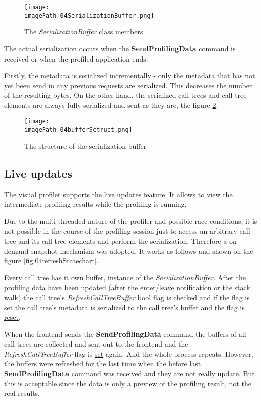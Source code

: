\begin{figure}
	\centering
		\texttt{[image: \\imagePath 04SerializationBuffer.png]}
		\caption{The \textit{SerializationBuffer} class members}
	\label{fig:04SerializationBuffer}
\end{figure}

The actual serialization occurs when the \textbf{SendProfilingData} command is received or when the profiled application ends. 

Firstly, the metadata is serialized incrementally - only the metadata that has not yet been send in any previous requests are serialized. This decreases the number of the resulting bytes. On the other hand, the serialized call trees and call tree elements are always fully serialized and sent as they are, the figure \ref{fig:04bufferSctruct}.

\begin{figure}
	\centering
		\texttt{[image: \\imagePath 04bufferSctruct.png]}
		\caption{The structure of the serialization buffer }
	\label{fig:04bufferSctruct}
\end{figure}

\subsection{Live updates}
The visual profiler supports the live updates feature. It allows to view the intermediate profiling results while the profiling is running. 

Due to the multi-threaded nature of the profiler and possible race conditions, it is not possible in the course of the profiling session just to access an arbitrary call tree and its call tree elements and perform the serialization. Therefore a on-demand snapshot mechanism was adopted. It works as follows and shown on the figure \ref{fig:04refreshStatechart}. 

Every call tree has it own buffer, instance of the \textit{SerializationBuffer}. After the profiling data have been updated (after the enter/leave notification or the stack walk) the call tree's \textit{RefreshCallTreeBuffer} bool flag is checked and if the flag is \underline{set} the call tree's metadata is serialized to the call tree's buffer and the flag is \underline{reset}. 

When the frontend sends the \textbf{SendProfilingData} command the buffers of all call trees are collected and sent out to the frontend and the \textit{RefreshCallTreeBuffer} flag is \underline{set} again. And the whole process repeats. However, the buffers were refreshed for the last time when the before last \textbf{SendProfilingData} command was received and they are not really update. But this is acceptable since the data is only a preview of the profiling result, not the real results.

